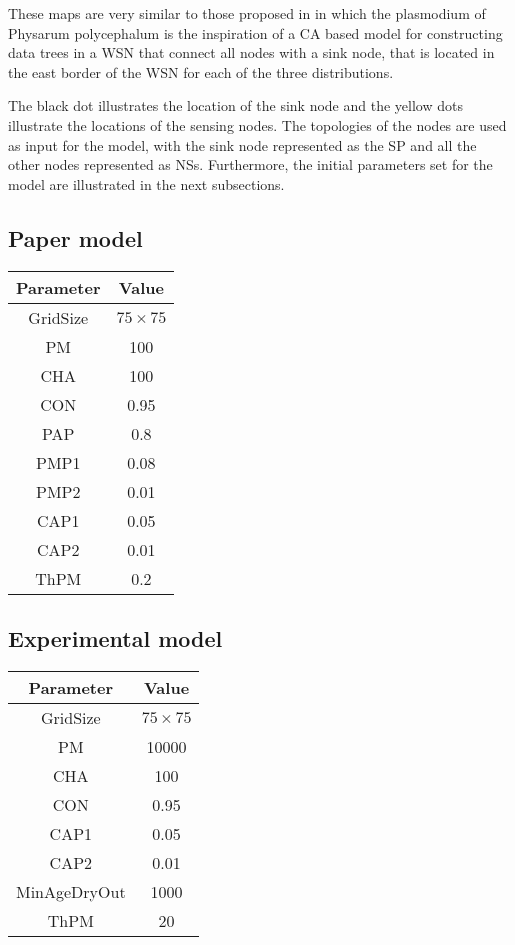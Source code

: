These maps are very similar to those proposed in \cite{tsompanas2015cellular} in which the plasmodium of Physarum polycephalum is the inspiration of a CA based model for constructing data trees in a WSN that connect all nodes with a sink node, that is located in the east border of the WSN for each of the three distributions.

\par
The black dot illustrates the location of the sink node and the yellow dots illustrate the locations of the sensing nodes. The topologies of the nodes are used as input for the model, with the sink node represented as the SP and all the other nodes represented as NSs. Furthermore, the initial parameters set for the model are illustrated in the next subsections.

\subsection{Paper model}

\begin{center}
 \begin{tabular}{||c c||} 
 \hline
 Parameter & Value \\ [0.5ex] 
 \hline\hline
 GridSize & $75 \times 75$ \\ 
 \hline
 PM & 100 \\ 
 \hline
 CHA & 100 \\ 
 \hline
 CON & 0.95 \\ 
 \hline
 PAP & 0.8 \\ 
 \hline
 PMP1 & 0.08 \\ 
 \hline
 PMP2 & 0.01 \\ 
 \hline
 CAP1 & 0.05 \\ 
 \hline
 CAP2 & 0.01 \\ 
 \hline
 ThPM & 0.2 \\ [1ex] 
 \hline
 \end{tabular}
\end{center}

\subsection{Experimental model}

\begin{center}
 \begin{tabular}{||c c||} 
 \hline
 Parameter & Value \\ [0.5ex] 
 \hline\hline
 GridSize & $75 \times 75$ \\ 
 \hline
 PM & 10000 \\ 
 \hline
 CHA & 100 \\ 
 \hline
 CON & 0.95 \\ 
 \hline
 CAP1 & 0.05 \\ 
 \hline
 CAP2 & 0.01 \\ 
 \hline
 MinAgeDryOut & 1000 \\
 \hline
 ThPM & 20 \\ [1ex] 
 \hline
 \end{tabular}
\end{center}

